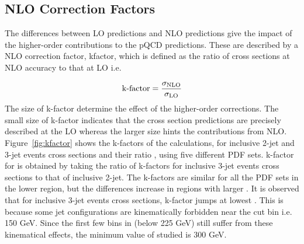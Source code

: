 \subsection{NLO Correction Factors}
\label{sec:nlo_factors}
The differences between LO predictions and NLO predictions give the impact of the higher-order contributions to the pQCD predictions. These are described by a NLO correction factor, k\hy factor, which is defined as the ratio of cross sections at NLO accuracy to that at LO i.e.

\begin{equation}
\label{eq:kfactors}
 {\rm k\hy factor} = \frac{\sigma_{\rm NLO}}{\sigma_{\rm LO}}
\end{equation}
The size of k-factor determine the effect of the higher-order corrections. The small size of k-factor indicates that the cross section predictions are precisely described at the LO whereas the larger size hints the contributions from NLO. Figure~\ref{fig:kfactor} shows the k-factors of the \NLOJETPP calculations, for inclusive 2-jet and 3-jet events cross sections and their ratio \ratio, using five different PDF sets. k-factor for \ratio is obtained by taking the ratio of k-factors for inclusive 3-jet events cross sections to that of inclusive 2-jet. The k-factors are similar for all the PDF sets in the lower region, but the differences increase in regions with larger \httwo. It is observed that for inclusive 3-jet events cross sections, k-factor jumps at lowest \httwo. This is because some jet configurations are kinematically forbidden near the \pt cut bin i.e. 150 GeV. Since the first few bins in \httwo (below 225 GeV) still suffer from these kinematical effects, the minimum value of \httwo studied is 300 GeV.

